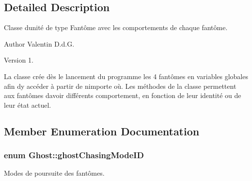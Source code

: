 \subsection{Detailed Description}
Classe d\textquotesingle{}unité de type Fantôme avec les comportements de chaque fantôme. 

\begin{DoxyAuthor}{Author}
Valentin D.\+d.\+G. 
\end{DoxyAuthor}
\begin{DoxyVersion}{Version}
1.
\end{DoxyVersion}
La classe crée dès le lancement du programme les 4 fantômes en variables globales afin d\textquotesingle{}y accéder à partir de n\textquotesingle{}importe où. Les méthodes de la classe permettent aux fantômes d\textquotesingle{}avoir différents comportement, en fonction de leur identité ou de leur état actuel. 

\subsection{Member Enumeration Documentation}
\hypertarget{class_ghost_a95bc4313fdf87d827c64fe9607fcc205}{}
\subsubsection[{ghost\+Chasing\+Mode\+I\+D}]{\setlength{\rightskip}{0pt plus 5cm}enum {\bf Ghost\+::ghost\+Chasing\+Mode\+I\+D}}\label{class_ghost_a95bc4313fdf87d827c64fe9607fcc205}


Modes de poursuite des fantômes. 

